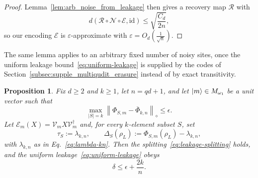 \documentclass[10pt,twocolumn,superscriptaddress,aps,amsmath,amssymb,citeautoscript,floatfix,prx]{revtex4-2}
\theoremstyle{plain}
\theoremstyle{plain}
\theoremstyle{plain}
\theoremstyle{plain}
\theoremstyle{plain}
\theoremstyle{plain}
\theoremstyle{plain}
\newtheorem{smproposition}[smtheorem]{Proposition}
\theoremstyle{definition}
\theoremstyle{plain}
\begin{document}
\begin{appendix}
\begin{proof}
    Lemma~\ref{lem:arb_noise_from_leakage} then gives a recovery map \(\mathcal R\) with
    \[
        d(\mathcal R\circ\mathcal N\circ\mathcal E,\mathrm{id})
        \leq
        \sqrt{\frac{C_d}{2n}},
    \]
    so our encoding $\mathcal{E}$ is $\varepsilon$-approximate with $\varepsilon=O_{d}\left(\frac{1}{\sqrt{n}}\right)$.
\end{proof}

The same lemma applies to an arbitrary fixed number of noisy sites, once the uniform leakage bound~\eqref{eq:uniform-leakage} is supplied by the codes of Section~\ref{subsec:supple_multiqudit_erasure} 
instead of by exact transitivity.

\begin{smproposition}\label{prop:k-site-uniform-leakage}
    Fix $d\ge2$ and $k\ge1$, let $n=qd+1$, and let $\ket m\in M_{\omega_1}$ be a unit vector such that
    \begin{equation}
    \label{eq:diamond-hypothesis}
        \max_{|S|=k}
        \left\|\Phi_{S,m}-\overline\Phi_{k,n}\right\|_\diamond
        \le\epsilon .
    \end{equation}
    Let $\mathcal E_m(X)=\mathcal{V}_mX\mathcal{V}_m^\dagger$ and, for every $k$-element subset $S$, set
    \[
        \tau_S:=\lambda_{k,n},
        \qquad
        \Delta_S(\rho_L):=\Phi_{S,m}(\rho_L)-\lambda_{k,n},
    \]
    with $\lambda_{k,n}$ as in Eq.~\eqref{eq:lambda-kn}. Then the splitting~\eqref{eq:leakage-splitting} holds, and the uniform leakage~\eqref{eq:uniform-leakage} obeys
    \begin{equation}
    \label{eq:k-leakage-bound}
        \delta\le\epsilon+\frac{2k}n .
    \end{equation}
\end{smproposition}


\end{appendix}
\end{document}
